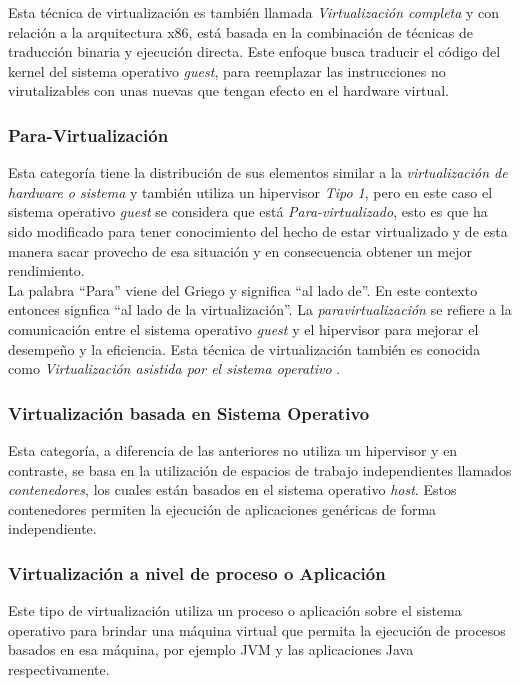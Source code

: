 Esta técnica de virtualización es también llamada \textit{Virtualización completa} y con relación a la arquitectura x86, está basada en la combinación de técnicas de traducción binaria y ejecución directa. Este enfoque busca traducir el código del kernel del sistema operativo \textit{guest}, para reemplazar las instrucciones no virutalizables con unas nuevas que tengan efecto en el hardware virtual\parencite{VMware2008}. 

\subsubsection{Para-Virtualización}
Esta categoría tiene la distribución de sus elementos similar a la \textit{virtualización de hardware o sistema} y también utiliza un hipervisor \textit{Tipo 1}, pero en este caso el sistema operativo \textit{guest} se considera que está \textit{Para-virtualizado}, esto es que ha sido modificado para tener conocimiento del hecho de estar virtualizado y de esta manera sacar provecho de esa situación y en consecuencia obtener un mejor rendimiento. \parencite{Pessolani2012}\\

La palabra ``Para'' viene del Griego y significa ``al lado de''. En este contexto entonces signfica ``al lado de la virtualización''. La \textit{paravirtualización} se refiere a la comunicación entre el sistema operativo \textit{guest} y el hipervisor para mejorar el desempeño y la eficiencia. Esta técnica de virtualización también es conocida como \textit{Virtualización asistida por el sistema operativo} \parencite{VMware2008}.



\subsubsection{Virtualización basada en Sistema Operativo}
Esta categoría, a diferencia de las anteriores no utiliza un hipervisor y en contraste, se basa en la utilización de espacios de trabajo independientes llamados \textit{contenedores}, los cuales están basados en el sistema operativo \textit{host}. Estos contenedores permiten la ejecución de aplicaciones genéricas de forma independiente.\\

\subsubsection{Virtualización a nivel de proceso o Aplicación}
Este tipo de virtualización utiliza un proceso  o aplicación sobre el sistema operativo para brindar una máquina virtual que permita la ejecución de procesos basados en esa máquina, por ejemplo JVM y las aplicaciones Java respectivamente. \\ 


